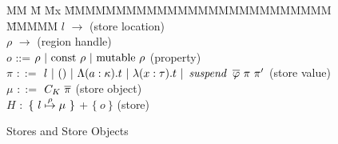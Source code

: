 \begin{figure}[ht!]
\begin{tabbing}
MM 	\= M \= Mx \= MMMMMMMMMMMMMMMMMMMMMMMMMM \= MMMMM \kill
	\> $l$		\> $\to$	\> (store location) 
	\\
	\> $\rho$	\> $\to$	\> (region handle) 
	\\
	\> $o$		\> ::=		\> $\rho \ 
						| \ \rconst \ \rho \
						| \ \rmutable \ \rho$ 
					\> (property)
	\\
	\> $\pi$	\> $::=$	\> $l \
						| \ () \
						| \ \Lambda(a : \kappa). t \
						| \ \lambda(x : \tau). t \
						| \ \isuspend \ \ov{\varphi} \ \pi \ \pi'$
					\> (store value)
	\\
	\> $\mu$	\> $::=$	\> $C_K \ \overline{\pi}$
					\> (store object)
	\\
	\> $H$		\> $:$		\> $\{ \ l \stackrel{\rho}{\mapsto} \mu \ \}$ + $\{ \ o \ \}$
					\> (store)
\end{tabbing}		
\vspace{-1em}
\caption{Stores and Store Objects}
\label{fig:dynamic-objects}
\end{figure}